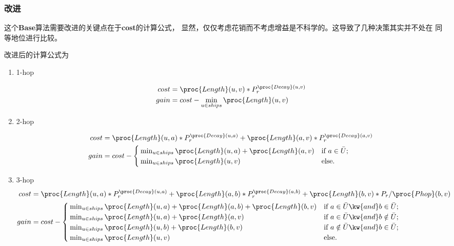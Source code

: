\documentclass[hyperref,UTF8]{ctexart}
\theoremstyle{definition}
\theoremstyle{remark}
\numberwithin{equation}{subsection}
\newcommand{\Emph}{\textbf}
\begin{document}
\subsubsection{改进}

	这个\Emph{Base}算法需要改进的关键点在于\Emph{cost}的计算公式，
	显然，仅仅考虑花销而不考虑增益是不科学的。这导致了几种决策其实并不处在
	同等地位进行比较。
	
	改进后的计算公式为
	\begin{enumerate}[(1)]
		
		\item 1-hop
		
		\begin{align}
			cost &= \proc{Length}(u, v) * P_r^{\proc{Decay}(u, v)}	\\
			gain &= cost - \min_{u \in ships} {\proc{Length}(u, v)}
		\end{align}
		
		\item 2-hop
		
		\begin{align}
			cost &= \proc{Length}(u, a) * P_r^{\proc{Decay}(u, a)} + \proc{Length}(a, v) * P_r^{\proc{Decay}(a, v)}	\\
			gain &= cost - \begin{cases}
				\min_{u \in ships} {\proc{Length}(u, a) + \proc{Length}(a, v)} & \text{if } a \in \bar{U};	\\
				\min_{u \in ships} {\proc{Length}(u, v)} & \text{else}.	
			\end{cases}
		\end{align}
		
		\item 3-hop
		\begin{align}
			cost &= \proc{Length}(u, a) * P_r^{\proc{Decay}(u, a)} + \proc{Length}(a, b) * P_r^{\proc{Decay}(a, b)} + \proc{Length}(b, v) * P_r / \proc{Phop}(b, v)	\\
			gain &= cost - \begin{cases}
				\min_{u \in ships} {\proc{Length}(u, a) + \proc{Length}(a, b) + \proc{Length}(b, v)} & \text{if } a \in \bar{U} \kw{ and } b \in \bar{U};	\\
				\min_{u \in ships} {\proc{Length}(u, a) + \proc{Length}(a, v)} & \text{if } a \in \bar{U} \kw{ and } b \notin \bar{U};	\\
				\min_{u \in ships} {\proc{Length}(u, b) + \proc{Length}(b, v)} & \text{if } a \notin \bar{U} \kw{ and } b \in \bar{U};	\\
				\min_{u \in ships} {\proc{Length}(u, v)} & \text{else}.
			\end{cases}
		\end{align}
		
	\end{enumerate}
	
\end{document}
